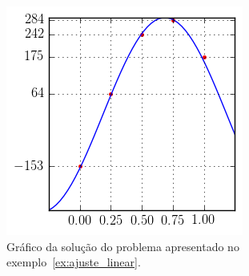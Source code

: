 \begin{sol}
\end{sol}

\begin{figure}
  \centering
  \includegraphics{cap_ajuste/pics/ex_ajuste_linear/ex_ajuste_linear}
  \caption{Gráfico da solução do problema apresentado no exemplo~\ref{ex:ajuste_linear}.}
  \label{fig:ex_ajuste_linear}
\end{figure}


